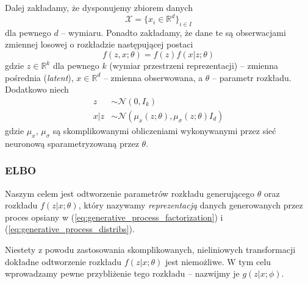 \documentclass{iithesis}
\begin{document}
Dalej zakładamy, że dysponujemy zbiorem danych
$$
\mathcal{X} = \{x_i \in \mathbb{R}^{d}\}_{i \in I}
$$
dla pewnego $d$ -- wymiaru. Ponadto zakładamy, że dane te są obserwacjami
zmiennej losowej o rozkładzie następującej postaci
\begin{equation}
f(z, x; \theta) = f(z)f(x|z; \theta)
\label{eq:generative_process_factorization}
\end{equation}
gdzie $z \in \mathbb{R}^k$ dla pewnego $k$ (wymiar przestrzeni reprezentacji) -- zmienna pośrednia (\textit{latent}), $x \in \mathbb{R}^d$ -- zmienna obserwowana,
a $\theta$ -- parametr rozkładu. Dodatkowo niech
\begin{equation}
\begin{split}
z &\sim \mathcal{N}(0, I_k) \\
x|z &\sim \mathcal{N}(\mu_x(z; \theta), \mu_\sigma(z;\theta)I_d)
\end{split}
\label{eq:generative_process_distribs}
\end{equation}
gdzie $\mu_x,\,\mu_{\sigma}$ są skomplikowanymi obliczeniami
wykonywanymi przez sieć neuronową sparametryzowaną przez $\theta$.

\subsubsection{ELBO} \label{sec:elbo}
Naszym celem jest odtworzenie parametrów rozkładu generującego $\theta$
oraz rozkładu $f(z|x; \theta)$, który nazywamy \textit{reprezentacją} danych
generowanych przez proces opsiany w
(\ref{eq:generative_process_factorization}) i (\ref{eq:generative_process_distribs}).

Niestety z powodu zastosowania skomplikowanych, nieliniowych
transformacji dokładne odtworzenie rozkładu $f(z|x; \theta)$ jest niemożliwe.
W tym celu wprowadzamy pewne przybliżenie tego rozkładu -- nazwijmy je
$g(z|x; \phi)$.
\end{document}
